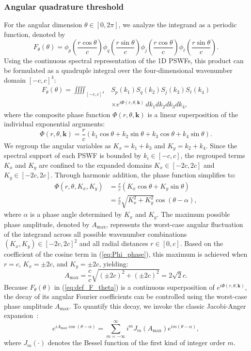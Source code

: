 \documentclass[lettersize,journal]{IEEEtran}
\theoremstyle{plain}
\begin{document}
\subsubsection{Angular quadrature threshold}
For the angular dimension $\theta \in [0, 2\pi]$, we analyze the integrand as a periodic function, denoted by
$$
	F_\theta(\theta) = \phi_p(\frac{r\cos\theta}{c})\phi_q(\frac{r\sin\theta}{c})\phi_j(\frac{r\cos\theta}{c})\phi_\ell(\frac{r\sin\theta}{c}). 
$$
Using the continuous spectral representation of the 1D PSWFs, this product can be formulated as a quadruple integral over the four-dimensional wavenumber domain $[-c, c]^4$:
\begin{align}
	F_\theta(\theta) = \iiiint_{[-c,c]^4}& S_p(k_1)S_q(k_2)S_j(k_3)S_\ell(k_4) \nonumber \\ 
	&\times e^{i \Phi(r, \theta, \mathbf{k})} \,dk_1 dk_2 dk_3 dk_4,
	\label{eq:def_F_theta}
\end{align}
where the composite phase function $\Phi(r, \theta, \mathbf{k})$ is a linear superposition of the individual exponential arguments:
$$
	\Phi(r, \theta, \mathbf{k}) = \frac{r}{c} (k_1\cos\theta + k_2\sin\theta + k_3\cos\theta + k_4\sin\theta).
$$
We regroup the angular variables as $K_x = k_1 + k_3$ and $K_y = k_2 + k_4$. Since the spectral support of each PSWF is bounded by $k_i \in [-c, c]$, the regrouped terms $K_x$ and $K_y$ are confined to the expanded domains $K_x \in [-2c, 2c]$ and $K_y \in [-2c, 2c]$. Through harmonic addition, the phase function simplifies to:
\begin{align}
	\Phi(r, \theta,K_x, K_y) & = \frac{r}{c} (K_x\cos\theta + K_y\sin\theta) \nonumber \\
	& = \frac{r}{c} \sqrt{K_x^2 + K_y^2} \cos(\theta - \alpha),
	\label{eq:Phi_phase}
\end{align} 
where $\alpha$ is a phase angle determined by $K_x$ and $K_y$.
The maximum possible phase amplitude, denoted by $A_{\max}$, represents the worst-case angular fluctuation of the integrand across all possible wavenumber combinations $(K_x, K_y) \in [-2c, 2c]^2$ and all radial distances $r \in [0, c]$. Based on the coefficient of the cosine term in (\ref{eq:Phi_phase}), this maximum is achieved when $r=c$, $K_x = \pm 2c$, and $K_y = \pm 2c$, yielding:
\begin{equation}
	A_{\max} = \frac{c}{c}\sqrt{(\pm 2c)^2 + (\pm 2c)^2} = 2\sqrt{2}c.
	\label{eq:A_max}
\end{equation}  
Because $F_\theta(\theta)$ in (\ref{eq:def_F_theta}) is a continuous superposition of $e^{i\Phi(r, \theta, \mathbf{k})}$, the decay of its angular Fourier coefficients can be controlled using the worst-case phase amplitude $A_{\max}$. To quantify this decay, we invoke the classic Jacobi-Anger expansion~\cite{Abramowitz1964Handbook}:  
$$
	e^{i A_{\max} \cos(\theta - \alpha)} = \sum_{m=-\infty}^{\infty} i^m J_m(A_{\max}) e^{i m (\theta - \alpha)},
$$
where $J_m(\cdot)$ denotes the Bessel function of the first kind of integer order $m$. 
\end{document}
